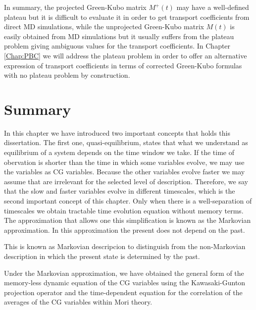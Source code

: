 \documentclass[b5paper,openright,10pt]{book}
\newcommand{\Note}[1]{{\bf \color{red}#1}}    %
\begin{document}
In  summary,  the projected  Green-Kubo  matrix  $M^+(t)$ may  have  a
well-defined plateau  but it is difficult  to evaluate it in  order to
get  transport  coefficients from  direct  MD  simulations, while  the
unprojected  Green-Kubo  matrix  $M(t)$  is easily  obtained  from  MD
simulations but  it usually  suffers from  the plateau  problem giving
ambiguous values for the transport coefficients.  In Chapter \ref{Chap:PBC} we will address the plateau problem in order to offer an alternative expression of transport coefficients in terms of corrected Green-Kubo formulas with no plateau problem by construction.

\section{Summary}
In this chapter we have introduced two important concepts that holds this dissertation. The first one, quasi-equilibrium, states that what we understand as equilibrium of a system depends on the time window we take. If the time of obervation is shorter than the time in which some variables evolve, we may use the variables as CG variables. 
Because the other variables evolve faster we may assume that are irrelevant for the selected level of description. 
Therefore, we say that the slow and faster variables evolve in different timescales, which is the second important concept of this chapter. 
Only when there is a well-separation of timescales we obtain tractable time evolution equation without memory terms. 
The approximation that allows one this simplification is known as the Markovian approximation. In this approximation the present does not depend on the past. 

This is known as Markovian descripcion to distinguish from the non-Markovian description in which the present state is determined by the past. 

Under the Markovian approximation, we have obtained the general form of the memory-less dynamic equation of the CG variables using the Kawasaki-Gunton projection operator and the time-dependent equation for the correlation of the averages of the CG variables within Mori theory. 

\end{document}
